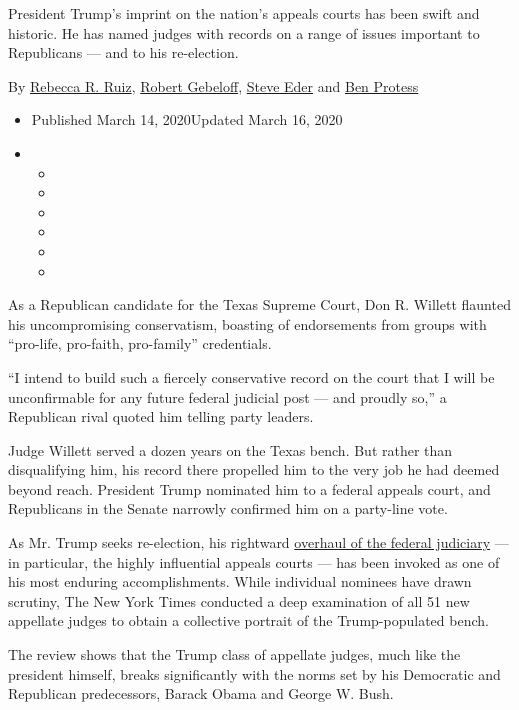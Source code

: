 President Trump's imprint on the nation's appeals courts has been swift
and historic. He has named judges with records on a range of issues
important to Republicans --- and to his re-election.

By \href{https://www.nytimes.com/by/rebecca-r-ruiz}{Rebecca R. Ruiz},
\href{https://www.nytimes.com/by/robert-gebeloff}{Robert Gebeloff},
\href{https://www.nytimes.com/by/steve-eder}{Steve Eder} and
\href{https://www.nytimes.com/by/ben-protess}{Ben Protess}

\begin{itemize}
\item
  Published March 14, 2020Updated March 16, 2020
\item
  \begin{itemize}
  \item
  \item
  \item
  \item
  \item
  \item
  \end{itemize}
\end{itemize}

As a Republican candidate for the Texas Supreme Court, Don R. Willett
flaunted his uncompromising conservatism, boasting of endorsements from
groups with ``pro-life, pro-faith, pro-family'' credentials.

``I intend to build such a fiercely conservative record on the court
that I will be unconfirmable for any future federal judicial post ---
and proudly so,'' a Republican rival quoted him telling party leaders.

Judge Willett served a dozen years on the Texas bench. But rather than
disqualifying him, his record there propelled him to the very job he had
deemed beyond reach. President Trump nominated him to a federal appeals
court, and Republicans in the Senate narrowly confirmed him on a
party-line vote.

As Mr. Trump seeks re-election, his rightward
\href{https://www.nytimes.com/2020/06/29/us/politics/supreme-court-trump-biden.html}{overhaul
of the federal judiciary} --- in particular, the highly influential
appeals courts --- has been invoked as one of his most enduring
accomplishments. While individual nominees have drawn scrutiny, The New
York Times conducted a deep examination of all 51 new appellate judges
to obtain a collective portrait of the Trump-populated bench.

The review shows that the Trump class of appellate judges, much like the
president himself, breaks significantly with the norms set by his
Democratic and Republican predecessors, Barack Obama and George W. Bush.

